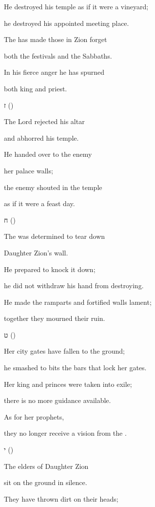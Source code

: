 {\par }{\Q {}He destroyed his temple as if it were a vineyard;
\par }{\Q he destroyed his appointed meeting place.
\par }{\Q The
{} has made those in Zion forget
\par }{\Q both the festivals and the Sabbaths.
\par }{\Q In his fierce anger he has spurned
\par }{\Q both king and priest.
\par }{\SH ז ({})
\par }{\Q {}The Lord rejected his altar
\par }{\Q and abhorred his temple.
\par }{\Q He handed over to the enemy
\par }{\Q her palace walls;
\par }{\Q the enemy shouted in the
{} temple
\par }{\Q as if it were a feast day.
\par }{\SH ח ({})
\par }{\Q {}The
{} was determined to tear down
\par }{\Q Daughter Zion’s wall.
\par }{\Q He prepared to knock it down;
\par }{\Q he did not withdraw his hand from destroying.
\par }{\Q He made the ramparts and fortified walls lament;
\par }{\Q together they mourned their ruin.
\par }{\SH ט ({})
\par }{\Q {}Her city gates have fallen to the ground;
\par }{\Q he smashed to bits the bars that lock her gates.
\par }{\Q Her king and princes were taken into exile;
\par }{\Q there is no more guidance available.
\par }{\Q As for her prophets,
\par }{\Q they no longer receive a vision from the
{}.
\par }{\SH י ({})
\par }{\Q {}The elders of Daughter Zion
\par }{\Q sit on the ground in silence.
\par }{\Q They have thrown dirt on their heads;
}
